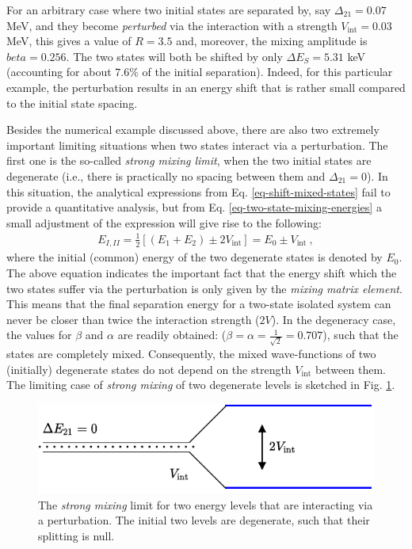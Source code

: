 For an arbitrary case where two initial states are separated by, say $\Delta_{21}=0.07$ MeV, and they become \emph{perturbed} via the interaction with a strength $V_\text{int}=0.03$ MeV, this gives a value of $R=3.5$ and, moreover, the mixing amplitude is $beta=0.256$. The two states will both be shifted by only $\Delta E_S=5.31$ keV (accounting for about $7.6 \%$ of the initial separation). Indeed, for this particular example, the perturbation results in an energy shift that is rather small compared to the initial state spacing.


Besides the numerical example discussed above, there are also two extremely important limiting situations when two states interact via a perturbation. The first one is the so-called \emph{strong mixing limit}, when the two initial states are degenerate (i.e., there is practically no spacing between them and $\Delta_{21}=0$). In this situation, the analytical expressions from Eq. \ref{eq-shift-mixed-states} fail to provide a quantitative analysis, but from Eq. \ref{eq-two-state-mixing-energies} a small adjustment of the expression will give rise to the following:
\begin{align}
    E_{I,II}=\frac{1}{2}\left[(E_1+E_2)\pm2V_\text{int}\right]=E_0\pm V_\text{int}\ ,
\end{align}
where the initial (common) energy of the two degenerate states is denoted by $E_0$. The above equation indicates the important fact that the energy shift which the two states suffer via the perturbation is only given by the \emph{mixing matrix element}. This means that the final separation energy for a two-state isolated system can never be closer than twice the interaction strength ($2V$). In the degeneracy case, the values for $\beta$ and $\alpha$ are readily obtained: ($\beta=\alpha=\frac{1}{\sqrt{2}}=0.707$), such that the states are completely mixed. Consequently, the mixed wave-functions of two (initially) degenerate states do not depend on the strength $V_\text{int}$ between them. The limiting case of \emph{strong mixing} of two degenerate levels is sketched in Fig. \ref{strong-mixing-fig}.

\begin{figure}
    \centering
    \includegraphics[scale=0.95]{Chapters/Figures/mixing_strong_coupling.pdf}
    \caption{The \emph{strong mixing} limit for two energy levels that are interacting via a perturbation. The initial two levels are degenerate, such that their splitting is null.}
    \label{strong-mixing-fig}
\end{figure}

